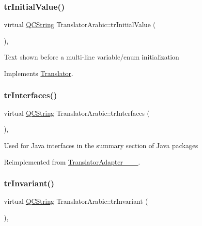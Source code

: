 \mbox{\label{class_translator_arabic_a53954a512040eb590ba15eead23028c3}} 
\subsubsection{\texorpdfstring{trInitialValue()}{trInitialValue()}}
{\footnotesize\ttfamily virtual \mbox{\hyperlink{class_q_c_string}{Q\+C\+String}} Translator\+Arabic\+::tr\+Initial\+Value (\begin{DoxyParamCaption}{ }\end{DoxyParamCaption})\hspace{0.3cm}{\ttfamily [inline]}, {\ttfamily [virtual]}}

Text shown before a multi-\/line variable/enum initialization 

Implements \mbox{\hyperlink{class_translator}{Translator}}.

\mbox{\label{class_translator_arabic_a4ecad397cc77436ee6922966d5a2b741}} 
\subsubsection{\texorpdfstring{trInterfaces()}{trInterfaces()}}
{\footnotesize\ttfamily virtual \mbox{\hyperlink{class_q_c_string}{Q\+C\+String}} Translator\+Arabic\+::tr\+Interfaces (\begin{DoxyParamCaption}{ }\end{DoxyParamCaption})\hspace{0.3cm}{\ttfamily [inline]}, {\ttfamily [virtual]}}

Used for Java interfaces in the summary section of Java packages 

Reimplemented from \mbox{\hyperlink{class_translator_adapter__1__8__4}{Translator\+Adapter\+\_\+\_\+\_}}.

\mbox{\label{class_translator_arabic_ade17d8c502815f2621b59e7ceee94ad7}} 
\subsubsection{\texorpdfstring{trInvariant()}{trInvariant()}}
{\footnotesize\ttfamily virtual \mbox{\hyperlink{class_q_c_string}{Q\+C\+String}} Translator\+Arabic\+::tr\+Invariant (\begin{DoxyParamCaption}{ }\end{DoxyParamCaption})\hspace{0.3cm}{\ttfamily [inline]}, {\ttfamily [virtual]}}

